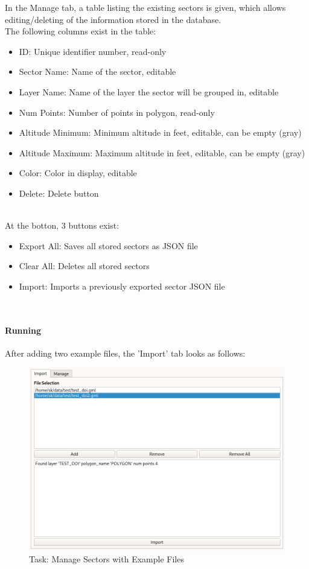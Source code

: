 In the Manage tab, a table listing the existing sectors is given, which allows editing/deleting of the information stored in the database. \\

The following columns exist in the table:
\begin{itemize}  
\item ID: Unique identifier number, read-only
\item Sector Name: Name of the sector, editable
\item Layer Name: Name of the layer the sector will be grouped in, editable
\item Num Points: Number of points in polygon, read-only
\item Altitude Minimum: Minimum altitude in feet, editable, can be empty (gray)
\item Altitude Maximum: Maximum altitude in feet, editable, can be empty (gray)
\item Color: Color in display, editable
\item Delete: Delete button
\end{itemize}
\ \\

At the botton, 3 buttons exist:

\begin{itemize}  
\item Export All: Saves all stored sectors as JSON file
\item Clear All: Deletes all stored sectors
\item Import: Imports a previously exported sector JSON file
\end{itemize}
\ \\

\paragraph {Running}

After adding two example files, the 'Import' tab looks as follows:

\begin{figure}[H]
    \includegraphics[width=16cm,frame]{../screenshots/manage_sectors_ready.png}
  \caption{Task: Manage Sectors with Example Files}
\end{figure}

